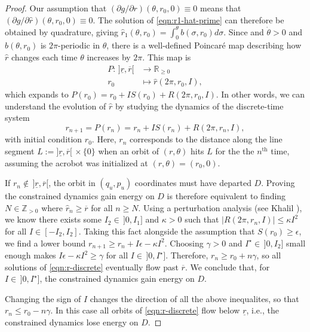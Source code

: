 \documentclass[journal,twoside,web, twocolumn,draftcls]{ieeecolor}
\begin{document}
\begin{proof}
    Our assumption that \((\partial g/\partial r)(\theta,r_0,0) \equiv 0\)
    means that \((\partial g/\partial \hat{r})(\theta,r_0,0) \equiv 0\).
    The solution of \eqref{eqn:r1-hat-prime} can therefore be obtained by
    quadrature, giving
    \(\hat{r}_1(\theta,r_0) = \int_0^\theta b(\sigma,r_0)d\sigma\).
    Since and \(\dot{\theta} > 0\) and \(b(\theta,r_0)\) is \(2\pi\)-periodic in
    \(\theta\), there is a well-defined Poincar\'{e} map describing
    how \(\hat{r}\) changes each time \(\theta\) increases by \(2\pi\).
    This map is 
    \begin{align}\label{eqn:poincare-map}
        P : \, ]\underline{r},\overline{r}[ &\to \mathbb{R}_{\geq 0} \\
        r_0 &\mapsto \hat{r}(2\pi,r_0,I)
        ,
    \end{align}
    which expands to \(P(r_0) = r_0 + IS(r_0) + R(2\pi,r_0,I)\).
    In other words, we can understand the evolution of \(\hat{r}\) by studying
    the dynamics of the discrete-time system
    \begin{equation}\label{eqn:r-discrete}
        r_{n+1} = P(r_n) =  r_n + IS(r_n) + R(2\pi,r_n,I)
        ,
    \end{equation}
    with initial condition \(r_0\).
    Here, \(r_n\) corresponds to the distance along the line segment
    \(L := ]\underline{r},\overline{r}[ \, \times \{0\}\)
    when an orbit of \((r,\theta)\) hits \(L\) for the the \(n^\text{th}\) time,
    assuming the acrobot was initialized at \((r,\theta) = (r_0,0)\).

    If \(r_n \not\in \, ]\underline{r},\overline{r}[\), the orbit 
    in \((q_u,p_u)\) coordinates must have
    departed \(D\). %
    Proving the constrained dynamics gain energy on \(D\) is therefore
    equivalent to finding \(N \in \mathbb{Z}_{> 0}\) where 
    \(\hat{r}_{n} \geq \overline{r}\) for all \(n \geq N\).
    Using a perturbation analysis (see Khalil 
    \cite[Theorem 10.1]{khalil_nonlinear}),
    we know there exists some \(I_2 \in \, ]0,I_1]\) and \(\kappa > 0\)
    such that \(\left|R(2\pi,r_n,I)\right| \leq \kappa I^2\) for all 
    \(I \in [-I_2,I_2]\).
    Taking this fact alongside the assumption that \(S(r_0) \geq \epsilon\),
    we find a lower bound \(r_{n+1} \geq r_n + I\epsilon - \kappa I^2\).
    Choosing \(\gamma > 0\) and \(I^\star \in \, ]0,I_2]\) small enough makes 
    \(I\epsilon - \kappa I^2 \geq \gamma\) for all \(I \in \, ]0,I^\star]\).
    Therefore, \(r_{n} \geq r_0 + n\gamma\), 
    so all solutions of \eqref{eqn:r-discrete} eventually flow past
    \(\overline{r}\).
    We conclude that, for \(I \in \, ]0, I^\star]\), the constrained dynamics gain
    energy on \(D\).

    Changing the sign of \(I\) changes the direction of all the
    above inequalites, so that \(r_{n} \leq r_0 - n\gamma\). 
    In this case all orbits of \eqref{eqn:r-discrete} flow below
    \(\underline{r}\), i.e., the constrained dynamics lose energy on \(D\).
\end{proof}
\end{document}
